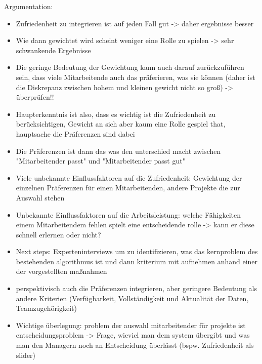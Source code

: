 Argumentation:
\begin{itemize}
    \item Zufriedenheit zu integrieren ist auf jeden Fall gut -> daher ergebnisse besser
    \item Wie dann gewichtet wird scheint weniger eine Rolle zu spielen -> sehr schwankende Ergebnisse
    \item Die geringe Bedeutung der Gewichtung kann auch darauf zurückzuführen sein, dass viele Mitarbeitende auch das präferieren, was sie können (daher ist die Diskrepanz zwischen hohem und kleinen gewicht nicht so groß) -> überprüfen!!
    \item Haupterkenntnis ist also, dass es wichtig ist die Zufriedenheit zu berücksichtigen, Gewicht an sich aber kaum eine Rolle gespiel that, hauptsache die Präferenzen sind dabei
    \item Die Präferenzen ist dann das was den unterschied macht zwischen "Mitarbeitender passt" und "Mitarbeitender passt gut"
    \item Viele unbekannte Einflussfaktoren auf die Zufriedenheit: Gewichtung der einzelnen Präferenzen für einen Mitarbeitenden, andere Projekte die zur Auswahl stehen
    \item Unbekannte Einflussfaktoren auf die Arbeitsleistung: welche Fähigkeiten einem Mitarbeitendem fehlen spielt eine entscheidende rolle -> kann er diese schnell erlernen oder nicht?
    \item Next steps: Experteninterviews um zu identifizieren, was das kernproblem des bestehenden algorithmus ist und dann kriterium mit aufnehmen anhand einer der vorgestellten maßnahmen
    \item perspektivisch auch die Präferenzen integrieren, aber geringere Bedeutung als andere Kriterien (Verfügbarkeit, Vollständigkeit und Aktualität der Daten, Teamzugehörigkeit)
    \item Wichtige überlegung: problem der auswahl mitarbeitender für projekte ist entscheidungsproblem -> Frage, wieviel man dem system übergibt und was man den Managern noch an Entscheidung überlässt (bspw. Zufriedenheit als slider)
\end{itemize}



